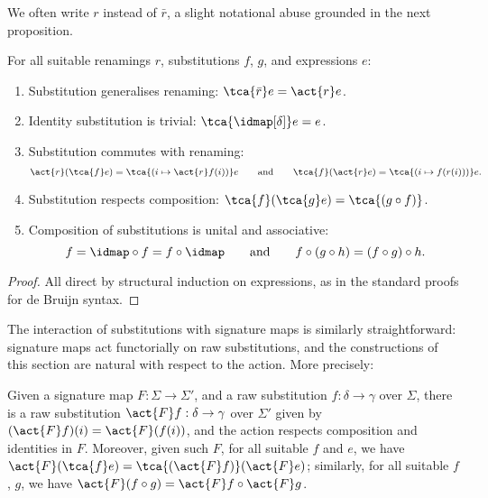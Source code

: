 We often write $r$ instead of $\bar{r}$, a slight notational abuse grounded in the next proposition.

\begin{proposition}
  For all suitable renamings $r$, substitutions $f$, $g$, and expressions $e$:
  \begin{enumerate}
  \item Substitution generalises renaming: $\tca{\bar{r}}e = \act{r}e$.
  \item Identity substitution is trivial: $\tca{\idmap[\delta]}e = e$.
  \item Substitution commutes with renaming:
    \begin{equation*}
      \act{r}(\tca{f}e) = \tca{(i \mapsto \act{r}f(i))} e
      \qquad\text{and}\qquad
      \tca{f}(\act{r}e) = \tca{(i \mapsto f(r(i)))} e.
    \end{equation*}

  \item Substitution respects composition: $\tca{f} (\tca{g} e) = \tca{(g \circ f)}$.
  \item Composition of substitutions is unital and associative:
    \begin{equation*}
      f = \idmap \circ f = f \circ \idmap
      \qquad\text{and}\qquad
      f \circ (g \circ h) = (f \circ g) \circ h.
    \end{equation*}
  \end{enumerate}
\end{proposition}

\begin{proof}
  All direct by structural induction on expressions, as in the standard proofs for de Bruijn syntax. 
\end{proof}

The interaction of substitutions with signature maps is similarly straightforward: signature maps act functorially on raw substitutions, and the constructions of this section are natural with respect to the action. More precisely:

\begin{propositionwithqed}
  Given a signature map $F : \Sigma \to \Sigma'$, and a raw substitution $f : \delta \to \gamma$ over $\Sigma$, there is a raw substitution $\act{F} f : \delta \to \gamma$ over $\Sigma'$ given by $(\act{F} f)(i) = \act{F}(f(i))$, and the action respects composition and identities in $F$.
  Moreover, given such $F$, for all suitable $f$ and $e$, we have $\act{F}(\tca{f} e) = \tca{(\act{F}f)} (\act{F}e)$; similarly, for all suitable $f$, $g$, we have $\act{F}(f \circ g) = \act{F}f \circ \act{F}g$. 
\end{propositionwithqed}

